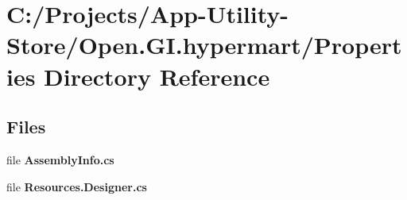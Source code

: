 \section{C\+:/\+Projects/\+App-\/\+Utility-\/\+Store/\+Open.G\+I.\+hypermart/\+Properties Directory Reference}
\label{dir_b5f26d72a946ac44ad84f75bb346b0d7}
\subsection*{Files}
\begin{DoxyCompactItemize}
\item 
file \textbf{ Assembly\+Info.\+cs}
\item 
file \textbf{ Resources.\+Designer.\+cs}
\end{DoxyCompactItemize}
